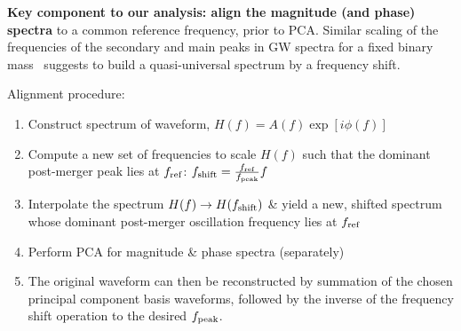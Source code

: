 \documentclass[a0,landscape]{a0poster}
\begin{document}
\begin{multicols}{4}
{\bf Key component to our analysis: align the magnitude (and phase) spectra} to
a common reference frequency, prior to PCA.   Similar scaling of the frequencies
of the secondary and main peaks in GW spectra for a fixed binary
mass~\cite{2015arXiv150203176B} suggests to build a quasi-universal spectrum by
a frequency shift.

Alignment procedure:
\begin{enumerate}
    \item Construct spectrum of waveform, $H(f) = A(f)\exp[i\phi(f)]$
    \item Compute a new set of frequencies to scale $H(f)$ such that the
        dominant post-merger peak lies at $f_{\rm ref}$:
            $f_{\rm shift} = \frac{f_{\rm ref}}{f_{\rm peak}}  f$
    \item Interpolate the spectrum $H(f)\rightarrow H(f_{\rm shift})$ \& yield a
        new, shifted spectrum whose dominant post-merger oscillation frequency
        lies at $f_{\rm ref}$
    \item Perform PCA for magnitude \& phase spectra (separately)
    \item The original waveform can then be reconstructed by summation of
        the chosen principal component basis waveforms, followed by the inverse
        of the frequency shift operation to the desired $f_{\rm peak}$.
\end{enumerate}
%
%
\begin{minipage}{\columnwidth}
\makeatletter
\newcommand{\@captype}{figure}
\makeatother
\centering
{}\qquad%
\caption{\emph{Top row}: magnitude spectra (left) and principal component
scores (right) of the original waveforms.  Note the wide range in peak
locations and variety of peak locations in the scores.  \emph{Bottom row}:
spectra following the frequency shifting procedure and the corresponding PC
scores.  Waveform frequencies have been scaled such that the peaks align at
1\,kHz (red vertical line).  Only a few scores now dominate.}
\end{minipage}


\end{multicols}
\end{document}
